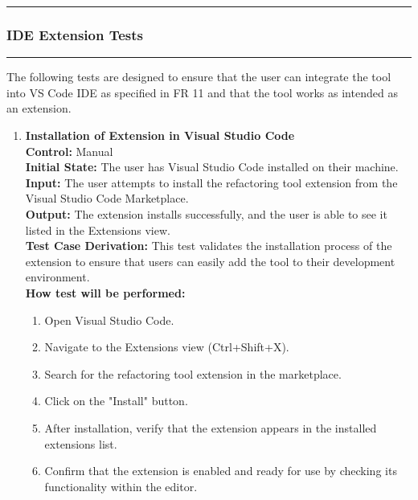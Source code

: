 \documentclass[12pt, titlepage]{article}
\newcommand{\colorrule}{\textcolor{BlueViolet}{\rule{\linewidth}{2pt}}}
\begin{document}
\noindent
\colorrule

\subsubsection{IDE Extension Tests}
\colorrule

\medskip

\noindent
The following tests are designed to ensure that the user can integrate the tool into VS Code IDE as specified in FR 11 and that the tool works as intended as an extension.

\begin{enumerate}[label={\bf \textcolor{Maroon}{test-FR-IE-\arabic*}}, wide=0pt, font=\itshape]
  \item \textbf{Installation of Extension in Visual Studio Code}\\[2mm]
    \textbf{Control:} Manual\\
    \textbf{Initial State:} The user has Visual Studio Code installed on their machine.\\
    \textbf{Input:} The user attempts to install the refactoring tool extension from the Visual Studio Code Marketplace.\\
    \textbf{Output:} The extension installs successfully, and the user is able to see it listed in the Extensions view.\\[2mm]
    \textbf{Test Case Derivation:} This test validates the installation process of the extension to ensure that users can easily add the tool to their development environment.\\[2mm]
    \textbf{How test will be performed:} 
    \begin{enumerate}[label=\arabic*.]
        \item Open Visual Studio Code.
        \item Navigate to the Extensions view (Ctrl+Shift+X).
        \item Search for the refactoring tool extension in the marketplace.
        \item Click on the "Install" button.
        \item After installation, verify that the extension appears in the installed extensions list.
        \item Confirm that the extension is enabled and ready for use by checking its functionality within the editor.
    \end{enumerate}


\end{enumerate}
\end{document}
